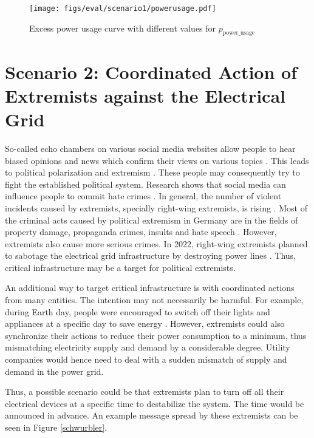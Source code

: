 \begin{figure}[!ht]
    \centering
    \texttt{[image: figs/eval/scenario1/powerusage.pdf]}
    \caption{Excess power usage curve with different values for 
    $p_{\mathrm{power\_usage}}$}
    \label{scen1variablepowerusage} 
\end{figure}

\section{Scenario 2: Coordinated Action of Extremists 
against the Electrical Grid}
\label{scenario2total}
So-called echo chambers on various social media websites allow people to 
hear biased opinions and news which confirm their views on 
various topics \cite{terren2021echo}. This leads to political
polarization and extremism \cite{van2022banality}.
These people may consequently try to fight the established political
system. Research shows that social media can influence people
to commit hate crimes \cite{muller2021fanning}.
In general, the number of violent incidents caused by
extremists, specially right-wing extremists, is rising 
\cite{koehler2016right}. 
Most of the criminal acts caused by political extremism 
in Germany are in the fields of property damage, 
propaganda crimes, insults and hate speech \cite{bmicrimestatistics}.
However, extremists also cause more serious crimes. In 2022,
right-wing extremists planned to sabotage the electrical grid 
infrastructure by destroying power lines \cite{anschlagstrom}.
Thus, critical infrastructure may be a target
for political extremists. 

An additional way to target critical infrastructure is with coordinated
actions from many entities. The intention may not necessarily be harmful. 
For example, during Earth day, people were encouraged to switch off their 
lights and appliances at a specific day to save energy \cite{earthday}.
However, extremists could also synchronize their actions to reduce their
power consumption to a minimum, thus mismatching electricity supply
and demand by a considerable degree. Utility companies would 
hence need to deal with a sudden mismatch of supply and demand in 
the power grid.

Thus, a possible scenario could be 
that extremists plan to turn off all their electrical devices at 
a specific time to destabilize the system. The
time would be announced in advance. An example message spread by
these extremists can be seen in Figure \ref{schwurbler}.

